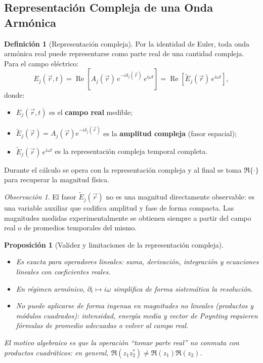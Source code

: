 \documentclass[12pt, a4paper]{article}
\theoremstyle{plain}
\newtheorem{proposicion}[teorema]{Proposición}
\theoremstyle{definition}
\newtheorem{definicion}[teorema]{Definición}
\theoremstyle{remark}
\newtheorem*{observacion}{Observación}
\newcommand{\ve}[1]{\vec{#1}}
\begin{document}
\subsection{Representación Compleja de una Onda Armónica}

\begin{definicion}[Representación compleja]
Por la identidad de Euler, toda onda armónica real puede representarse como
parte real de una cantidad compleja. Para el campo eléctrico:
\begin{equation}
  E_j(\ve{r},t)
  = \operatorname{Re}\!\left[A_j(\ve{r})\,e^{-i\delta_j(\ve{r})}\,e^{i\omega t}\right]
  = \operatorname{Re}\!\left[\widetilde{E}_j(\ve{r})\,e^{i\omega t}\right],
  \label{eq:compleja}
\end{equation}
donde:
\begin{itemize}
  \item $E_j(\ve{r},t)$ es el \textbf{campo real} medible;
  \item $\widetilde{E}_j(\ve{r})=A_j(\ve{r})e^{-i\delta_j(\ve{r})}$ es la
        \textbf{amplitud compleja} (fasor espacial);
  \item $\widetilde{E}_j(\ve{r})\,e^{i\omega t}$ es la representación compleja
        temporal completa.
\end{itemize}
Durante el cálculo se opera con la representación compleja y al final se toma
$\Re\{\cdot\}$ para recuperar la magnitud física.
\end{definicion}

\begin{observacion}
El fasor $\widetilde{E}_j(\ve{r})$ no es una magnitud directamente observable:
es una variable auxiliar que codifica amplitud y fase de forma compacta. Las
magnitudes medidas experimentalmente se obtienen siempre a partir del campo real
o de promedios temporales del mismo.
\end{observacion}

\begin{proposicion}[Validez y limitaciones de la representación compleja]
\begin{itemize}
  \item[\checkmark] Es exacta para operadores lineales: suma, derivación,
        integración y ecuaciones lineales con coeficientes reales.
  \item[\checkmark] En régimen armónico, $\partial_t \mapsto i\omega$ simplifica
        de forma sistemática la resolución.
  \item[$\boldsymbol{\times}$] No puede aplicarse de forma ingenua en magnitudes
        no lineales (productos y módulos cuadrados): intensidad, energía media
        y vector de Poynting requieren fórmulas de promedio adecuadas o volver
        al campo real.
\end{itemize}
\noindent El motivo algebraico es que la operación ``tomar parte real'' no
conmuta con productos cuadráticos: en general,
$\Re(z_1z_2^*)\neq \Re(z_1)\Re(z_2)$.
\end{proposicion}
\end{document}
